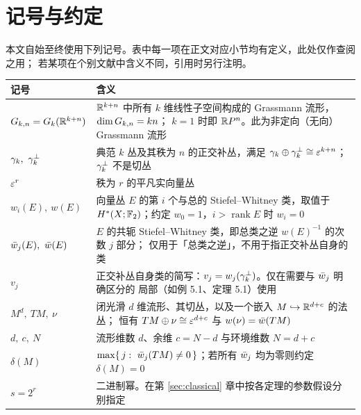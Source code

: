 \section*{记号与约定}

本文自始至终使用下列记号。表中每一项在正文对应小节均有定义，此处仅作查阅之用；
若某项在个别文献中含义不同，引用时另行注明。

\begin{center}
\small
\renewcommand{\arraystretch}{1.35}
\begin{tabularx}{\textwidth}{@{}>{\raggedright\arraybackslash}p{4.3cm}
    >{\raggedright\arraybackslash}X@{}}
\toprule
记号 & 含义 \\
\midrule
$G_{k,n}=G_k(\mathbb{R}^{k+n})$ &
$\mathbb{R}^{k+n}$ 中所有 $k$ 维线性子空间构成的 Grassmann 流形，$\dim G_{k,n}=kn$；
$k=1$ 时即 $\mathbb{R} P^{n}$。此为非定向（无向）Grassmann 流形 \\
\addlinespace[1pt]
$\cG_k,\ \cGc_k$ &
典范 $k$ 丛及其秩为 $n$ 的正交补丛，满足
$\gamma_k\oplus\gamma^{\perp}_k\cong\varepsilon^{k+n}$；$\gamma^{\perp}_k$ 不是切丛 \\
\addlinespace[1pt]
$\varepsilon^{r}$ &
秩为 $r$ 的平凡实向量丛 \\
\addlinespace[1pt]
$w_i(E),\ w(E)$ &
向量丛 $E$ 的第 $i$ 个与总的 Stiefel--Whitney 类，取值于
$H^{*}(X;\mathbb{F}_2)$；约定 $w_0=1$，$i>\operatorname{rank}E$ 时 $w_i=0$ \\
\addlinespace[1pt]
$\wbar_j(E),\ \wbar(E)$ &
$E$ 的共轭 Stiefel--Whitney 类，即总类之逆 $w(E)^{-1}$ 的次数 $j$ 部分；
仅用于「总类之逆」，不用于指正交补丛自身的类 \\
\addlinespace[1pt]
$v_j$ &
正交补丛自身类的简写：$v_j=w_j(\gamma^{\perp}_k)$。仅在需要与 $\bar w_j$ 明确区分的
局部（如例 5.1、定理 5.1）使用 \\
\addlinespace[1pt]
$M^{d},\ TM,\ \nu$ &
闭光滑 $d$ 维流形、其切丛，以及一个嵌入 $M\hookrightarrow\mathbb{R}^{d+c}$ 的法丛；
恒有 $TM\oplus\nu\cong\varepsilon^{d+c}$ 与 $w(\nu)=\bar w(TM)$ \\
\addlinespace[1pt]
$d,\ c,\ N$ &
流形维数 $d$、余维 $c=N-d$ 与环境维数 $N=d+c$ \\
\addlinespace[1pt]
$\delta(M)$ &
$\max\{\,j:\ \wbar_j(TM)\neq0\,\}$；若所有 $\bar w_j$ 均为零则约定
$\delta(M)=0$ \\
\addlinespace[1pt]
$s=2^{r}$ &
二进制幂。在第 \ref{sec:classical} 章中按各定理的参数假设分别指定 \\

\end{tabularx}
\end{center}
